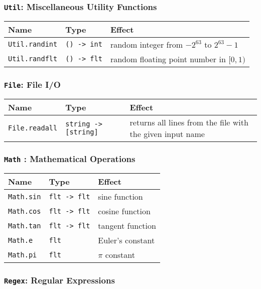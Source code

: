 \documentclass{article}
\newcommand{\code}[1]{\lstinline[columns=fixed]{#1}}
\begin{document}
			\subsubsection{\code{Util}: Miscellaneous Utility Functions}
			
				\begin{longtable}{l|l|l}
					\textbf{Name} & \textbf{Type} & \textbf{Effect} \\
					\midrule
					\code{Util.randint} & \code{() -> int} & random integer from $-2^63$ to $2^63-1$ \\
					\code{Util.randflt} & \code{() -> flt} & random floating point number in $[0,1)$
				\end{longtable}
			
			\subsubsection{\code{File}: File I/O}
			
				\begin{longtable}{l|l|l}
					\textbf{Name} & \textbf{Type} & \textbf{Effect} \\
					\midrule
					\code{File.readall} & \code{string -> [string]} & returns all lines from the file with the given input name
				\end{longtable}
			
			\subsubsection{\code{Math} : Mathematical Operations}
			
				\begin{longtable}{l|l|l}
					\textbf{Name} & \textbf{Type} & \textbf{Effect} \\
					\midrule
					\code{Math.sin} & \code{flt -> flt} & sine function \\
					\code{Math.cos} & \code{flt -> flt} & cosine function \\
					\code{Math.tan} & \code{flt -> flt} & tangent function \\
					\code{Math.e} & \code{flt} & Euler's constant \\
					\code{Math.pi} & \code{flt} & $\pi$ constant
				\end{longtable}
			
			\subsubsection{\code{Regex}: Regular Expressions}
			
\end{document}
